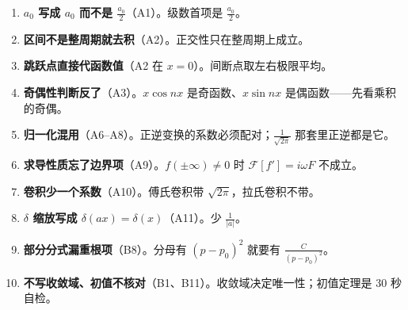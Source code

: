 \documentclass[11pt]{ctexart}
\begin{document}
\begin{enumerate}
\item \textbf{$a_0$ 写成 $a_0$ 而不是 $\frac{a_0}{2}$}（A1）。级数首项是 $\frac{a_0}{2}$。
\item \textbf{区间不是整周期就去积}（A2）。正交性只在整周期上成立。
\item \textbf{跳跃点直接代函数值}（A2 在 $x=0$）。间断点取左右极限平均。
\item \textbf{奇偶性判断反了}（A3）。$x\cos nx$ 是奇函数、$x\sin nx$ 是偶函数——先看乘积的奇偶。
\item \textbf{归一化混用}（A6–A8）。正逆变换的系数必须配对；$\frac{1}{\sqrt{2\pi}}$ 那套里正逆都是它。
\item \textbf{求导性质忘了边界项}（A9）。$f(\pm\infty)\ne0$ 时 $\mathcal F[f']=i\omega F$ 不成立。
\item \textbf{卷积少一个系数}（A10）。傅氏卷积带 $\sqrt{2\pi}$，拉氏卷积不带。
\item \textbf{$\delta$ 缩放写成 $\delta(ax)=\delta(x)$}（A11）。少 $\frac{1}{|a|}$。
\item \textbf{部分分式漏重根项}（B8）。分母有 $(p-p_0)^2$ 就要有 $\frac{C}{(p-p_0)^2}$。
\item \textbf{不写收敛域、初值不核对}（B1、B11）。收敛域决定唯一性；初值定理是 30 秒自检。
\end{enumerate}

\flowerrule

\end{document}
